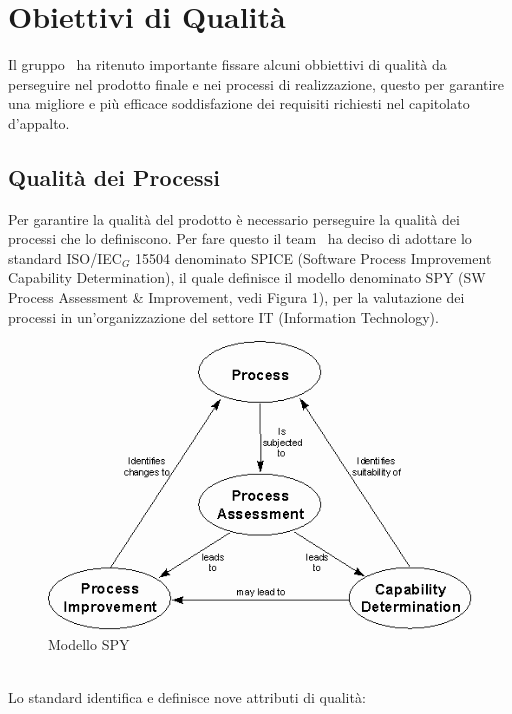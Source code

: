 \section{Obiettivi di Qualità}
Il gruppo \gruppo\ ha ritenuto importante fissare alcuni obbiettivi di qualità da perseguire nel prodotto finale e nei processi di realizzazione, questo per garantire una migliore e più efficace soddisfazione dei requisiti richiesti nel capitolato d'appalto.
\subsection{Qualità dei Processi}

Per garantire la qualità del prodotto è necessario perseguire la qualità dei processi che lo definiscono. Per fare questo il team \gruppo\ ha deciso di adottare lo standard ISO/IEC$_G$ 15504 denominato SPICE (Software Process Improvement Capability Determination), il quale definisce il modello denominato SPY (SW Process Assessment \& Improvement, vedi Figura 1), per la valutazione dei processi in un'organizzazione del settore IT (Information Technology).\\
\begin{figure}[h!]
		\centering
		\includegraphics[scale=.6]{img/Spy.png}
		\caption{Modello SPY}
		\label{fig:ModelloSpy}
\end{figure}
\\Lo standard identifica e definisce nove attributi di qualità:
\smallskip
